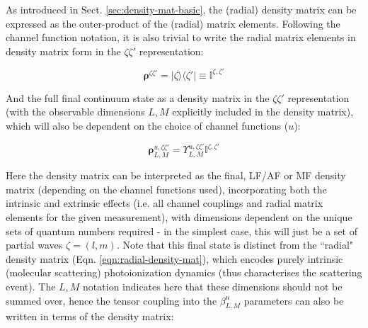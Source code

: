 \documentclass[10pt]{article}
\begin{document}



As introduced in Sect. \ref{sec:density-mat-basic}, the (radial) density matrix can be expressed as the outer-product of the (radial) matrix elements. Following the channel function notation, it is also trivial to write the radial matrix elements in density matrix form in the $\zeta\zeta'$ representation:

\begin{equation}
\mathbf{\rho}^{\zeta\zeta'} = |\zeta\rangle\langle\zeta'| \equiv \mathbb{I}^{\zeta,\zeta'}\label{eqn:radial-density-mat}
\end{equation}

And the full final continuum state as a density matrix in the $\zeta\zeta'$ representation (with the observable dimensions $L,M$ explicitly included in the density matrix), which will also be dependent on the choice of channel functions ($u$):

\begin{equation}
\mathbf{\rho}_{L,M}^{u,\zeta\zeta'}=\varUpsilon_{L,M}^{u,\zeta\zeta'}\mathbb{I}^{\zeta,\zeta'}
\end{equation}

Here the density matrix can be interpreted as the final, LF/AF or
MF density matrix (depending on the channel functions used), incorporating both the intrinsic and extrinsic
effects (i.e. all channel couplings and radial matrix elements for
the given measurement), with dimensions dependent on the unique sets of quantum numbers required - in the simplest case, this will just be a set of partial waves $\zeta = (l,m)$. Note that this final state is distinct from the ``radial" density matrix (Eqn. \ref{eqn:radial-density-mat}), which encodes purely intrinsic (molecular scattering) photoionization dynamics (thus characterises the scattering event). The $L,M$ notation indicates here that these dimensions should not be summed over, hence the tensor coupling into the $\beta_{L,M}^{u}$ parameters can also be written in terms of the density matrix:
\end{document}
